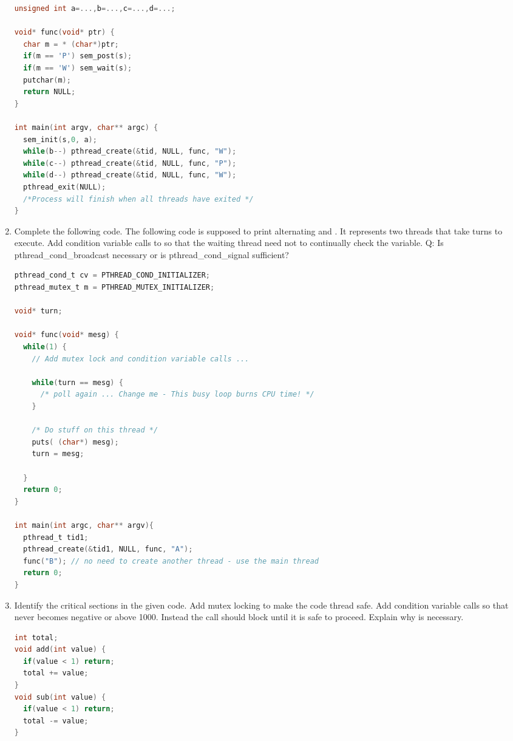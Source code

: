 \begin{enumerate}
\begin{lstlisting}[language=C]
unsigned int a=...,b=...,c=...,d=...;

void* func(void* ptr) {
  char m = * (char*)ptr;
  if(m == 'P') sem_post(s);
  if(m == 'W') sem_wait(s);
  putchar(m);
  return NULL;
}

int main(int argv, char** argc) {
  sem_init(s,0, a);
  while(b--) pthread_create(&tid, NULL, func, "W");
  while(c--) pthread_create(&tid, NULL, func, "P");
  while(d--) pthread_create(&tid, NULL, func, "W");
  pthread_exit(NULL);
  /*Process will finish when all threads have exited */
}
\end{lstlisting}

\item Complete the following code. The following code is supposed to print alternating  and . It represents two threads that take turns to execute. Add condition variable calls to  so that the waiting thread need not to continually check the  variable. Q: Is pthread\_cond\_broadcast necessary or is pthread\_cond\_signal sufficient?

\begin{lstlisting}[language=C]
pthread_cond_t cv = PTHREAD_COND_INITIALIZER;
pthread_mutex_t m = PTHREAD_MUTEX_INITIALIZER;

void* turn;

void* func(void* mesg) {
  while(1) {
    // Add mutex lock and condition variable calls ...

    while(turn == mesg) {
      /* poll again ... Change me - This busy loop burns CPU time! */
    }

    /* Do stuff on this thread */
    puts( (char*) mesg);
    turn = mesg;

  }
  return 0;
}

int main(int argc, char** argv){
  pthread_t tid1;
  pthread_create(&tid1, NULL, func, "A");
  func("B"); // no need to create another thread - use the main thread
  return 0;
}
\end{lstlisting}

\item Identify the critical sections in the given code. Add mutex locking to make the code thread safe. Add condition variable calls so that  never becomes negative or above 1000. Instead the call should block until it is safe to proceed. Explain why  is necessary.

\begin{lstlisting}[language=C]
int total;
void add(int value) {
  if(value < 1) return;
  total += value;
}
void sub(int value) {
  if(value < 1) return;
  total -= value;
}
\end{lstlisting}


\end{enumerate}
